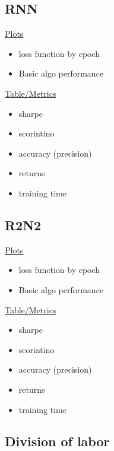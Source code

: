 \documentclass{article}
\begin{document}
\subsection{RNN}

\underline{Plots}
\begin{itemize}
\item loss function by epoch
\item Basic algo performance 
\end{itemize}

\underline{Table/Metrics}
\begin{itemize}
\item sharpe
\item scorintino
\item accuracy (precision)
\item returns
\item training time
\end{itemize}


\subsection{R2N2}


\underline{Plots}
\begin{itemize}
\item loss function by epoch
\item Basic algo performance 
\end{itemize}

\underline{Table/Metrics}
\begin{itemize}
\item sharpe
\item scorintino
\item accuracy (precision)
\item returns
\item training time
\end{itemize}


\subsection{Division of labor}
\end{document}
